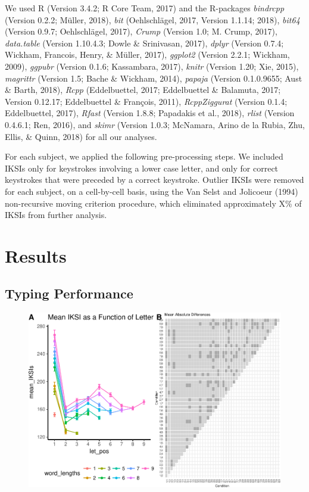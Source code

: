 \documentclass[floatsintext,man]{apa6}
\theoremstyle{definition}
\theoremstyle{definition}
\theoremstyle{definition}
\theoremstyle{remark}
\begin{document}
We used R (Version 3.4.2; R Core Team, 2017) and the R-packages
\emph{bindrcpp} (Version 0.2.2; Müller, 2018), \emph{bit} (Oehlschlägel,
2017, Version 1.1.14; 2018), \emph{bit64} (Version 0.9.7; Oehlschlägel,
2017), \emph{Crump} (Version 1.0; M. Crump, 2017), \emph{data.table}
(Version 1.10.4.3; Dowle \& Srinivasan, 2017), \emph{dplyr} (Version
0.7.4; Wickham, Francois, Henry, \& Müller, 2017), \emph{ggplot2}
(Version 2.2.1; Wickham, 2009), \emph{ggpubr} (Version 0.1.6;
Kassambara, 2017), \emph{knitr} (Version 1.20; Xie, 2015),
\emph{magrittr} (Version 1.5; Bache \& Wickham, 2014), \emph{papaja}
(Version 0.1.0.9655; Aust \& Barth, 2018), \emph{Rcpp} (Eddelbuettel,
2017; Eddelbuettel \& Balamuta, 2017; Version 0.12.17; Eddelbuettel \&
François, 2011), \emph{RcppZiggurat} (Version 0.1.4; Eddelbuettel,
2017), \emph{Rfast} (Version 1.8.8; Papadakis et al., 2018),
\emph{rlist} (Version 0.4.6.1; Ren, 2016), and \emph{skimr} (Version
1.0.3; McNamara, Arino de la Rubia, Zhu, Ellis, \& Quinn, 2018) for all
our analyses.

For each subject, we applied the following pre-processing steps. We
included IKSIs only for keystrokes involving a lower case letter, and
only for correct keystrokes that were preceded by a correct keystroke.
Outlier IKSIs were removed for each subject, on a cell-by-cell basis,
using the Van Selst and Jolicoeur (1994) non-recursive moving criterion
procedure, which eliminated approximately X\% of IKSIs from further
analysis.

\section{Results}\label{results}

\subsection{Typing Performance}\label{typing-performance}

\begin{figure}[htbp]
\centering
\includegraphics{Entropy_typing_draft_files/figure-latex/typing_mean_iksis_comparisons-1.pdf}
\caption{}
\end{figure}
\end{document}
